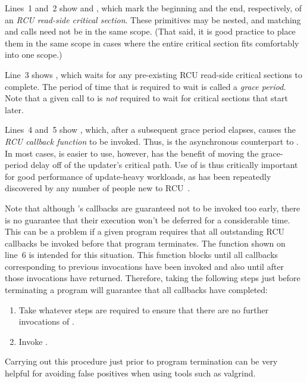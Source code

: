 \documentclass[letterpaper,10pt]{article}
\begin{document}
Lines~1 and~2 show  and ,
which mark the beginning and the end, respectively, of an \emph{RCU read-side
critical section}.
These primitives may be nested, and matching 
and  calls need not be in the same scope.
(That said, it is good practice to place them in the same scope
in cases where the entire critical section fits comfortably into
one scope.)

Line~3 shows , which waits for any pre-existing
RCU read-side critical sections to complete.
The period of time that  is required to wait is
called a \emph{grace period}.
Note that a given call to  is \emph{not} required to
wait for critical sections that start later.

Lines~4 and~5 show , which, after a subsequent grace period
elapses, causes the  \emph{RCU callback function} to be invoked.
Thus,  is the asynchronous counterpart to
.
In most cases,  is easier to use, however, 
has the benefit of moving the grace-period delay off of the updater's
critical path.
Use of  is thus critically important for good performance of
update-heavy workloads, as has been repeatedly discovered by any number of
people new to RCU~\cite{PaulEMcKenney2015ReadMostly}.

Note that although 's callbacks are guaranteed not to be
invoked too early, there is no guarantee that their execution won't be
deferred for a considerable time.
This can be a problem if a given program requires that all outstanding
RCU callbacks be invoked before that program terminates.
The  function shown on line~6 is intended for this
situation.
This function blocks until all callbacks corresponding to previous
 invocations have been invoked and also until after
those invocations have returned.
Therefore, taking the following steps just before terminating a program
will guarantee that all callbacks have completed:

\begin{enumerate}
\item	Take whatever steps are required to ensure that there are no
	further invocations of .
\item	Invoke .
\end{enumerate}

Carrying out this procedure just prior to program termination can be very
helpful for avoiding false positives when using tools such as valgrind.
\end{document}
